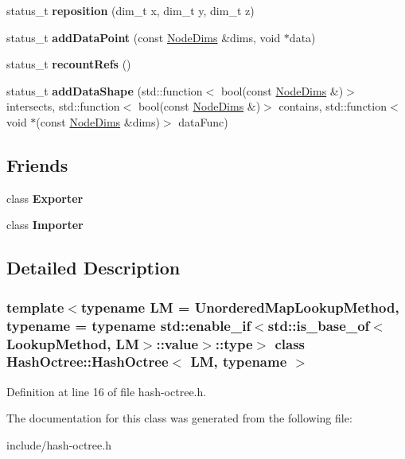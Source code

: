 \begin{DoxyCompactItemize}
status\+\_\+t {\bfseries reposition} (dim\+\_\+t x, dim\+\_\+t y, dim\+\_\+t z)
\item 
\mbox{\label{class_hash_octree_1_1_hash_octree_aedacd7d64e8ca54ef12f7edc65bfa609}} 
status\+\_\+t {\bfseries add\+Data\+Point} (const \mbox{\hyperlink{class_hash_octree_1_1_node_dims}{Node\+Dims}} \&dims, void $\ast$data)
\item 
\mbox{\label{class_hash_octree_1_1_hash_octree_a7afe494a353a2a7218d421ee0c78756d}} 
status\+\_\+t {\bfseries recount\+Refs} ()
\item 
\mbox{\label{class_hash_octree_1_1_hash_octree_ad8384c189348174bf10326c020a596fc}} 
status\+\_\+t {\bfseries add\+Data\+Shape} (std\+::function$<$ bool(const \mbox{\hyperlink{class_hash_octree_1_1_node_dims}{Node\+Dims}} \&)$>$ intersects, std\+::function$<$ bool(const \mbox{\hyperlink{class_hash_octree_1_1_node_dims}{Node\+Dims}} \&)$>$ contains, std\+::function$<$ void $\ast$(const \mbox{\hyperlink{class_hash_octree_1_1_node_dims}{Node\+Dims}} \&dims)$>$ data\+Func)
\end{DoxyCompactItemize}
\subsection*{Friends}
\begin{DoxyCompactItemize}
\item 
\mbox{\label{class_hash_octree_1_1_hash_octree_a2f641968ee4a70e8f584a437b28b8f5a}} 
class {\bfseries Exporter}
\item 
\mbox{\label{class_hash_octree_1_1_hash_octree_ad2d8744585dcb094644b1caed04ac9ed}} 
class {\bfseries Importer}
\end{DoxyCompactItemize}


\subsection{Detailed Description}
\subsubsection*{template$<$typename LM = Unordered\+Map\+Lookup\+Method, typename = typename std\+::enable\+\_\+if$<$std\+::is\+\_\+base\+\_\+of$<$\+Lookup\+Method, L\+M$>$\+::value$>$\+::type$>$\newline
class Hash\+Octree\+::\+Hash\+Octree$<$ L\+M, typename $>$}



Definition at line 16 of file hash-\/octree.\+h.



The documentation for this class was generated from the following file\+:\begin{DoxyCompactItemize}
\item 
include/hash-\/octree.\+h\end{DoxyCompactItemize}
